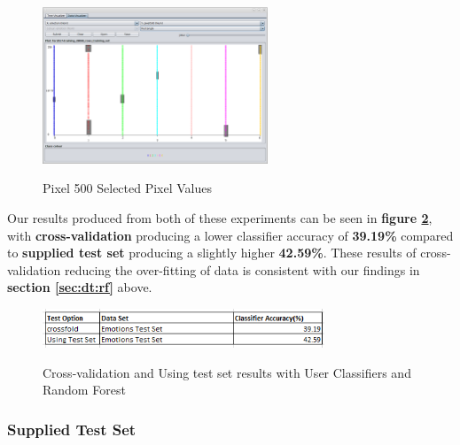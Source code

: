 \FloatBarrier
\begin{figure}[hbt!]
	\centering
      \includegraphics[width=0.6\textwidth]{imgs/userClassifier/noSplit/all/Train-and-Test/500.png} \\
	\caption{Pixel 500 Selected Pixel Values}
	\label{fig:dt:supplied_test_set:pixel500}
\end{figure}

Our results produced from both of these experiments can be seen in \textbf{figure \ref{fig:dt:uc:results}}, with \textbf{cross-validation} producing a lower classifier accuracy of \textbf{39.19\%} compared to  \textbf{supplied test set} producing a slightly higher \textbf{42.59\%}. These results of cross-validation reducing the over-fitting of data is consistent with our findings in \textbf{section \ref{sec:dt:rf}} above. 

\FloatBarrier
\begin{figure}[hbt!]
	\centering
      \includegraphics[width=0.75\textwidth]{imgs/userClassifier/noSplit/all/userclassifier_accuracy_results.PNG} \\
	\caption{Cross-validation and Using test set results with User Classifiers and Random Forest}
	\label{fig:dt:uc:results}
\end{figure}

\subsubsection{Supplied Test Set}
\label{sec:dt:uc:sts}


